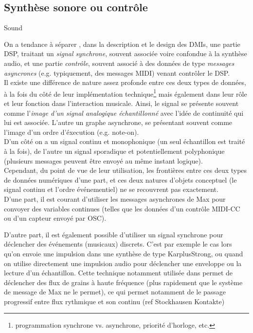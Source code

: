 
\subsection{Synthèse sonore ou contrôle}

Sound  \cite{di_scipio_sound_2003}

On a tendance à séparer , dans la description et le design des \glspl{DMI}, une partie \gls{DSP}, traitant un \textit{signal synchrone}, souvent associée voire confondue à la synthèse audio, et une partie \textit{contrôle}, souvent associé à des données de type \textit{messages asyncrones} (e.g. typiquement, des messages \gls{MIDI}) venant contrôler le \gls{DSP}.\\
Il existe une différence de nature assez profonde entre ces deux types de données, à la fois du côté de leur implémentation technique\footnote{programmation synchrone vs. asynchrone, priorité d'horloge, etc.} mais également dans leur rôle et leur fonction dans l'interaction musicale. 
Ainsi, le signal se présente souvent comme l'\textit{image d'un signal analogique échantillonné} avec l'idée de continuité qui lui est associée. L'autre un graphe asynchrone, se présentant souvent comme l'image d'un ordre d'éxecution (e.g. note-on). \\
D'un côté on a un signal continu et monophonique (un seul échantillon est traité à la fois), de l'autre un signal sporadique et potentiellement polyphonique (plusieurs messages peuvent être envoyé au même instant logique).\\

Cependant, du point de vue de leur utilisation, les frontières entre ces deux types de données numériques d'une part, et ces deux natures d'objets conceptuel (le signal continu et l'ordre événementiel) ne se recouvrent pas exactement. \\
D'une part, il est courant d'utiliser les messages asynchrones de Max pour convoyer des variables continues (telles que les données d'un contrôle MIDI-CC ou d'un capteur envoyé par \gls{OSC}).\\


D'autre part, il est également possible d'utiliser un signal synchrone pour déclencher des événements (musicaux) discrets. C'est par exemple le cas lors qu'on envoie une impulsion dans une synthèse de type \gls{KarplusStrong}, ou quand on utilise directement une impulsion audio pour déclencher une enveloppe ou la lecture d'un échantillon.
Cette technique notamment utilisée dans \cite{bascou_gmu_2005} permet de déclencher des flux de grains à haute fréquence (plus rapidement que le système de message de Max ne le permet), ce qui permet notamment de le passage progressif entre flux rythmique et son continu (ref Stockhausen Kontakte)


